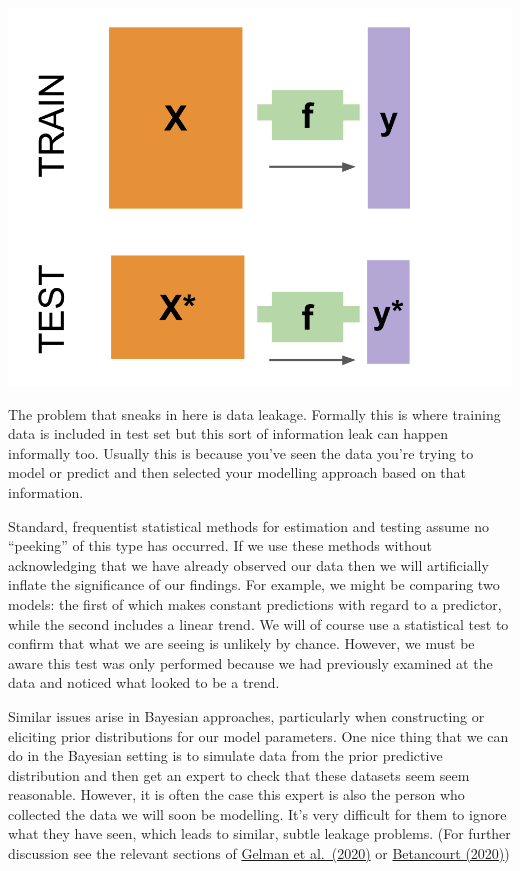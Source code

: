 \documentclass[
  letterpaper,
  DIV=11,
  numbers=noendperiod]{scrreprt}
\begin{document}
\includegraphics{images/302-data-exploration/supervise_learning_schematic.png}

The problem that sneaks in here is data leakage. Formally this is where
training data is included in test set but this sort of information leak
can happen informally too. Usually this is because you've seen the data
you're trying to model or predict and then selected your modelling
approach based on that information.

Standard, frequentist statistical methods for estimation and testing
assume no ``peeking'' of this type has occurred. If we use these methods
without acknowledging that we have already observed our data then we
will artificially inflate the significance of our findings. For example,
we might be comparing two models: the first of which makes constant
predictions with regard to a predictor, while the second includes a
linear trend. We will of course use a statistical test to confirm that
what we are seeing is unlikely by chance. However, we must be aware this
test was only performed because we had previously examined at the data
and noticed what looked to be a trend.

Similar issues arise in Bayesian approaches, particularly when
constructing or eliciting prior distributions for our model parameters.
One nice thing that we can do in the Bayesian setting is to simulate
data from the prior predictive distribution and then get an expert to
check that these datasets seem seem reasonable. However, it is often the
case this expert is also the person who collected the data we will soon
be modelling. It's very difficult for them to ignore what they have
seen, which leads to similar, subtle leakage problems. (For further
discussion see the relevant sections of
\href{https://doi.org/10.48550/arXiv.2011.01808}{Gelman et al.~(2020)}
or
\href{https://betanalpha.github.io/assets/case_studies/principled_bayesian_workflow.html}{Betancourt
(2020)})
\end{document}

